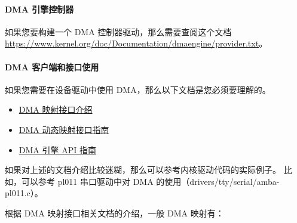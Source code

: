 \paragraph{DMA 引擎控制器}

如果您要构建一个 DMA 控制器驱动，那么需要查阅这个文档
\url{https://www.kernel.org/doc/Documentation/dmaengine/provider.txt}。

\paragraph{DMA 客户端和接口使用}

如果您需要在设备驱动中使用 DMA，那么以下文档是您必须要理解的。

\begin{itemize}
  \item \href{https://www.kernel.org/doc/Documentation/DMA-API.txt}{DMA 映射接口介绍}
  \item \href{https://www.kernel.org/doc/Documentation/DMA-API-HOWTO.txt}{DMA 动态映射接口指南}
  \item \href{https://www.kernel.org/doc/Documentation/dmaengine/client.txt}{DMA 引擎 API 指南}
\end{itemize}

如果对上述的文档介绍比较迷糊，那么可以参考内核驱动代码的实际例子。
比如，可以参考 pl011 串口驱动中对 DMA 的使用（drivers/tty/serial/amba-pl011.c）。

根据 DMA 映射接口相关文档的介绍，一般 DMA 映射有：


